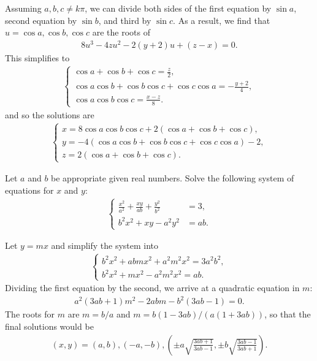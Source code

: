 \documentclass[12pt,a4paper]{memoir}
\theoremstyle{definition}
\begin{document}
\begin{solution}
	Assuming $a,b,c \neq k\pi$, we can divide both sides of the first equation by $\sin a$, second equation by $\sin b$, and third by $\sin c$. As a result, we find that $u=\cos a,\cos b, \cos c$ are the roots of 
	\begin{align*}
		8u^3-4zu^2-2(y+2)u+(z-x)=0.
	\end{align*}
	This simplifies to
	\begin{align*}
		\begin{cases}
			\cos a + \cos b + \cos c =\displaystyle \frac{z}{2},\\ \cos a \cos b + \cos b  \cos c + \cos c \cos a = \displaystyle -\frac{y+2}{4},\\ \cos a \cos b \cos c = \displaystyle \frac{x-z}{8}.
		\end{cases} 
	\end{align*}
	and so the solutions are
	\begin{align*}
		\begin{cases}
			x= 8 \cos a \cos b \cos c + 2 (\cos a + \cos b + \cos c),\\ y=-4(\cos a \cos b + \cos b  \cos c + \cos c \cos a)-2,\\ z = 2 (\cos a + \cos b + \cos c).
		\end{cases}
	\end{align*}
\end{solution}


\begin{question}\label{p:sys-eq-J}
	Let $a$ and $b$ be appropriate given real numbers. Solve the following system of equations for $x$ and $y$:
	\begin{align*}
		\begin{cases}
			\displaystyle \frac{x^2}{a^2}+\frac{xy}{ab}+\frac{y^2}{b^2} &=3,\\ b^2x^2+xy-a^2y^2 &=ab.
		\end{cases}
	\end{align*}
\end{question}


\begin{solution}
	Let $y=mx$ and simplify the system into
	\begin{align*}
		\begin{cases}
			b^2x^2+abmx^2+a^2m^2x^2=3a^2b^2,\\b^2x^2+mx^2-a^2m^2x^2=ab.
		\end{cases}
	\end{align*}
	Dividing the first equation by the second, we arrive at a quadratic equation in $m$:
	\begin{align*}
		a^2(3ab+1)m^2-2abm-b^2(3ab-1)=0.
	\end{align*}
	The roots for $m$ are $m=b/a$ and $m=b(1-3ab)/(a(1+3ab))$, so that the final solutions would be
	\begin{align*}
		(x,y)=(a,b),(-a,-b),\left(\pm a\sqrt{\frac{3ab+1}{3ab-1}}, \pm b\sqrt{\frac{3ab-1}{3ab+1}}\right).
	\end{align*}
\end{solution}
\end{document}
